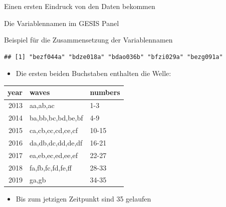 \documentclass[ignorenonframetext,]{beamer}
\providecommand{\tightlist}{%
  \setlength{\itemsep}{0pt}\setlength{\parskip}{0pt}}
\begin{document}
\begin{frame}{Einen ersten Eindruck von den Daten bekommen}
\end{frame}

\begin{frame}[fragile]{Die Variablennamen im GESIS Panel}

\begin{block}{Beispiel für die Zusammensetzung der Variablennamen}

\begin{verbatim}
## [1] "bezf044a" "bdze018a" "bdao036b" "bfzi029a" "bezg091a"
\end{verbatim}

\begin{itemize}
\tightlist
\item
  Die ersten beiden Buchstaben enthalten die Welle:
\end{itemize}

\begin{tabular}{r|l|l}
\hline
year & waves & numbers\\
\hline
2013 & aa,ab,ac & 1-3\\
\hline
2014 & ba,bb,bc,bd,be,bf & 4-9\\
\hline
2015 & ca,cb,cc,cd,ce,cf & 10-15\\
\hline
2016 & da,db,dc,dd,de,df & 16-21\\
\hline
2017 & ea,eb,ec,ed,ee,ef & 22-27\\
\hline
2018 & fa,fb,fc,fd,fe,ff & 28-33\\
\hline
2019 & ga,gb & 34-35\\
\hline
\end{tabular}

\begin{itemize}
\tightlist
\item
  Bis zum jetzigen Zeitpunkt sind 35 gelaufen
\end{itemize}

\end{block}

\end{frame}
\end{document}
